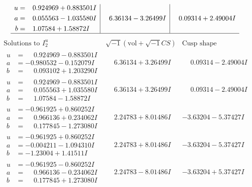 \documentclass[1p]{elsarticle_modified}
\theoremstyle{definition}
\newcommand{\I}{\sqrt{-1}}
\begin{document}
$$\begin{array}{c|c|c}
\begin{aligned}
u &= \phantom{-}0.924969 + 0.883501 I \\
a &= \phantom{-}0.055563 - 1.035580 I \\
b &= \phantom{-}1.07584 + 1.58872 I\end{aligned}
 & \phantom{-}6.36134 - 3.26499 I & \phantom{-}0.09314 + 2.49004 I\\
 \hline 
 \end{array}$$\newpage$$\begin{array}{c|c|c}  
\text{Solutions to }I^u_{2}& \I (\text{vol} + \sqrt{-1}CS) & \text{Cusp shape}\\
 \hline 
\begin{aligned}
u &= \phantom{-}0.924969 - 0.883501 I \\
a &= -0.980532 - 0.152079 I \\
b &= \phantom{-}0.093102 + 1.203290 I\end{aligned}
 & \phantom{-}6.36134 + 3.26499 I & \phantom{-}0.09314 - 2.49004 I \\ \hline\begin{aligned}
u &= \phantom{-}0.924969 - 0.883501 I \\
a &= \phantom{-}0.055563 + 1.035580 I \\
b &= \phantom{-}1.07584 - 1.58872 I\end{aligned}
 & \phantom{-}6.36134 + 3.26499 I & \phantom{-}0.09314 - 2.49004 I \\ \hline\begin{aligned}
u &= -0.961925 + 0.860252 I \\
a &= \phantom{-}0.966136 + 0.234062 I \\
b &= \phantom{-}0.177845 - 1.273080 I\end{aligned}
 & \phantom{-}2.24783 + 8.01486 I & -3.63204 - 5.37427 I \\ \hline\begin{aligned}
u &= -0.961925 + 0.860252 I \\
a &= -0.004211 - 1.094310 I \\
b &= -1.23004 + 1.41511 I\end{aligned}
 & \phantom{-}2.24783 + 8.01486 I & -3.63204 - 5.37427 I \\ \hline\begin{aligned}
u &= -0.961925 - 0.860252 I \\
a &= \phantom{-}0.966136 - 0.234062 I \\
b &= \phantom{-}0.177845 + 1.273080 I\end{aligned}
 & \phantom{-}2.24783 - 8.01486 I & -3.63204 + 5.37427 I \\ \hline\begin{aligned}

\end{aligned}
\end{array}$$
\end{document}
